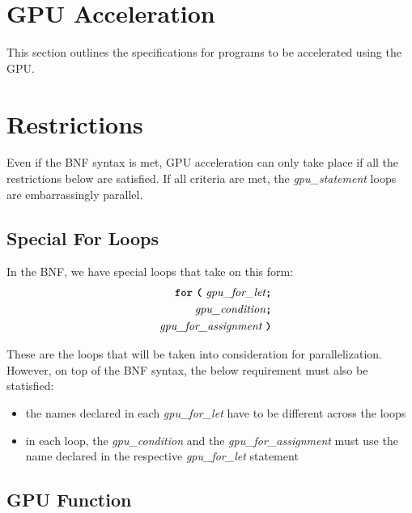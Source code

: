 



\newpage

\section*{GPU Acceleration}
\label{gpu_supp}
This section outlines the specifications for programs to be accelerated using the GPU.\


\newpage

\section*{Restrictions}

Even if the BNF syntax is met, GPU acceleration can only take place if all the restrictions below are satisfied. If all criteria are met, the \textit{gpu\_statement} loops are embarrassingly parallel.

\subsection*{Special For Loops}

In the BNF, we have special loops that take on this form:
\begin{alignat*}{9}
&& \textbf{\texttt{for}}\ \textbf{\texttt{(}} 
                          \ \textit{gpu\_for\_let} \textbf{\texttt{;}} \\
&& \ \ \textit{gpu\_condition} \textbf{\texttt{;}} \\
&& \textit{gpu\_for\_assignment} \ \textbf{\texttt{)}} 
\end{alignat*}

These are the loops that will be taken into consideration for parallelization. However, on top of the BNF syntax, the below requirement must also be statisfied:

\begin{itemize}
    \item{the names declared in each \textit{gpu\_for\_let} have to be different across the loops}
    \item{in each loop, the \textit{gpu\_condition} and the \textit{gpu\_for\_assignment} must use the name declared
    in the respective \textit{gpu\_for\_let} statement}
\end{itemize}

\subsection*{GPU Function}

